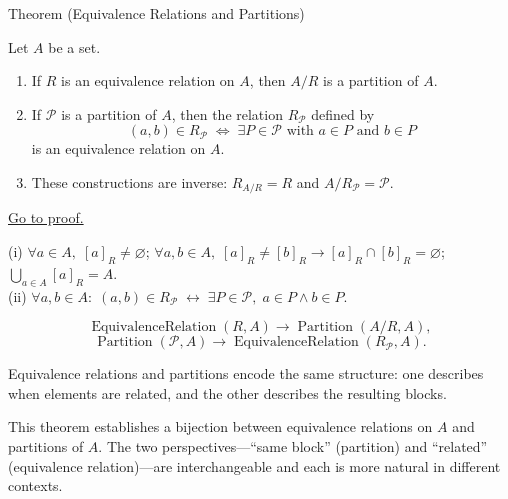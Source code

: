 \begin{theorembox}{Theorem (Equivalence Relations and Partitions)}
\begin{theorem}\label{thm:equiv-partition}
Let $A$ be a set.
\begin{enumerate}[label=(\roman*)]
\item If $R$ is an equivalence relation on $A$, then $A/R$ is a partition of $A$.
\item If $\mathcal{P}$ is a partition of $A$, then the relation
$R_{\mathcal{P}}$ defined by
\[
(a,b) \in R_{\mathcal{P}} \;\Longleftrightarrow\;
\exists P \in \mathcal{P} \text{ with } a \in P \text{ and } b \in P
\]
is an equivalence relation on $A$.
\item These constructions are inverse: $R_{A/R} = R$ and $A/R_{\mathcal{P}} = \mathcal{P}$.
\end{enumerate}
\hyperref[prf:equiv-partition]{Go to proof.}
\end{theorem}
\end{theorembox}

\begin{remark*}
(i) $\forall a \in A,\; [a]_R \neq \varnothing$; $\forall a,b \in A,\; [a]_R \neq [b]_R \to [a]_R \cap [b]_R = \varnothing$; $\bigcup_{a \in A}[a]_R = A$.\\
(ii) $\forall a,b \in A:\; (a,b) \in R_{\mathcal{P}} \;\leftrightarrow\; \exists P \in \mathcal{P},\; a \in P \wedge b \in P$.
\end{remark*}

\begin{remark*}
\[
  \operatorname{EquivalenceRelation}(R,A)
  \to
  \operatorname{Partition}(A/R,A),
\]
\[
  \operatorname{Partition}(\mathcal{P},A)
  \to
  \operatorname{EquivalenceRelation}(R_{\mathcal{P}},A).
\]
\end{remark*}

\begin{remark*}[Interpretation]
Equivalence relations and partitions encode the same structure: one describes
when elements are related, and the other describes the resulting blocks.
\end{remark*}

\begin{remark*}[Exposition]
This theorem establishes a bijection between equivalence relations on $A$
and partitions of $A$. The two perspectives---``same block'' (partition) and
``related'' (equivalence relation)---are interchangeable and each is more
natural in different contexts.
\end{remark*}

